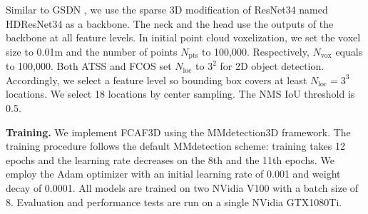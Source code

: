 \documentclass[runningheads]{llncs}
\begin{document}
Similar to GSDN \cite{gwak2020gsdn}, we use the sparse 3D modification of ResNet34 named HDResNet34 as a backbone. The neck and the head use the outputs of the backbone at all feature levels. In initial point cloud voxelization, we set the voxel size to 0.01m and the number of points $N_\text{pts}$ to 100,000. Respectively, $N_\text{vox}$ equals to 100,000. Both ATSS \cite{zhang2020atss} and FCOS \cite{tian2019fcos} set $N_{\text{loc}}$ to $3^2$ for 2D object detection. Accordingly, we select a feature level so bounding box covers at least $N_{\text{loc}} = 3^3$ locations. We select 18 locations by center sampling. The NMS IoU threshold is 0.5.

\textbf{Training.} We implement FCAF3D using the MMdetection3D \cite{2020mmdetection3d} framework. The training procedure follows the default MMdetection \cite{chen2019mmdetection} scheme: training takes 12 epochs and the learning rate decreases on the 8th and the 11th epochs. We employ the Adam optimizer with an initial learning rate of 0.001 and weight decay of 0.0001. All models are trained on two NVidia V100 with a batch size of 8. Evaluation and performance tests are run on a single NVidia GTX1080Ti.
\end{document}
